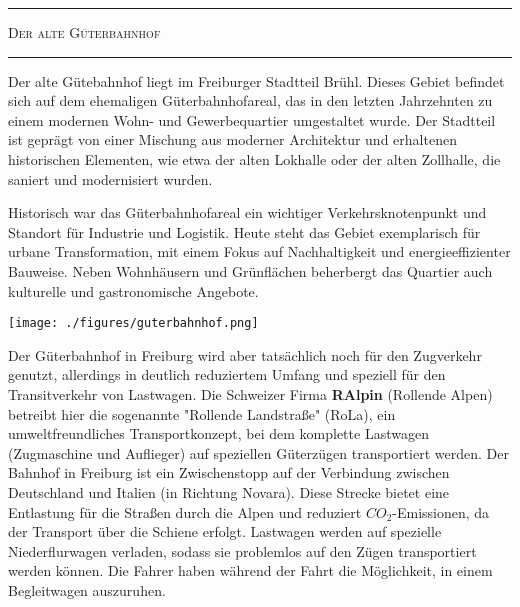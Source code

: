 \documentclass[landscape, a4paper]{article}
\newcommand\alert[1]{\textcolor{PrimaryColor}{\textbf{#1}}}
\begin{document}
\footnotesize
\begin{minipage}[t]{0.32\textwidth}
	\vspace{0cm}
	\setlength{\parskip}{0.25cm}
	\vspace{0.5cm}
	\textcolor{PrimaryColor}{
		\rule{\linewidth}{0.5mm}
		\vspace{-0.1cm}
		\begin{center}
			\large
			\textsc{Der alte Güterbahnhof}
		\end{center}
		\rule{\linewidth}{0.5mm}
	}

	Der alte Gütebahnhof liegt im Freiburger Stadtteil Brühl. Dieses Gebiet befindet sich auf dem ehemaligen Güterbahnhofareal, das in den letzten Jahrzehnten zu einem modernen Wohn- und Gewerbequartier umgestaltet wurde. Der Stadtteil ist geprägt von einer Mischung aus moderner Architektur und erhaltenen historischen Elementen, wie etwa der alten Lokhalle oder der alten Zollhalle, die saniert und modernisiert wurden.

	Historisch war das Güterbahnhofareal ein wichtiger Verkehrsknotenpunkt und Standort für Industrie und Logistik. Heute steht das Gebiet exemplarisch für urbane Transformation, mit einem Fokus auf Nachhaltigkeit und energieeffizienter Bauweise. Neben Wohnhäusern und Grünflächen beherbergt das Quartier auch kulturelle und gastronomische Angebote.%

	\texttt{[image: ./figures/guterbahnhof.png]}
	\setlength{\parskip}{0.25cm}

  Der Güterbahnhof in Freiburg wird aber tatsächlich noch für den Zugverkehr genutzt, allerdings in deutlich reduziertem Umfang und speziell für den Transitverkehr von Lastwagen. Die Schweizer Firma \alert{RAlpin} (Rollende Alpen) betreibt hier die sogenannte "Rollende Landstraße" (RoLa), ein umweltfreundliches Transportkonzept, bei dem komplette Lastwagen (Zugmaschine und Auflieger) auf speziellen Güterzügen transportiert werden. Der Bahnhof in Freiburg ist ein Zwischenstopp auf der Verbindung zwischen Deutschland und Italien (in Richtung Novara). Diese Strecke bietet eine Entlastung für die Straßen durch die Alpen und reduziert $CO_2$-Emissionen, da der Transport über die Schiene erfolgt. Lastwagen werden auf spezielle Niederflurwagen verladen, sodass sie problemlos auf den Zügen transportiert werden können. Die Fahrer haben während der Fahrt die Möglichkeit, in einem Begleitwagen auszuruhen.

\end{minipage}
\end{document}
